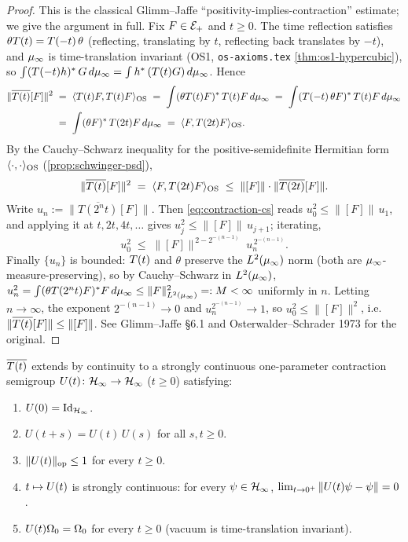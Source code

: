 \begin{proof}
This is the classical Glimm--Jaffe ``positivity-implies-contraction''
estimate; we give the argument in full.  Fix $F \in \mathcal{E}_+$ and $t \ge
0$.  The time reflection satisfies $\theta T(t) = T(-t)\,\theta$ (reflecting,
translating by $t$, reflecting back translates by $-t$), and $\mu_\infty$
is time-translation invariant (OS1, \texttt{os-axioms.tex}
\cref{thm:os1-hypercubic}), so $\int (T(-t) h)^*\, G \, d\mu_\infty =
\int h^*\, (T(t) G)\, d\mu_\infty$.  Hence
\begin{align}
  \|\overline{T(t)}[F]\|^2
  &\;=\; \langle T(t) F, T(t) F \rangle_{\mathrm{OS}}
   \;=\; \int (\theta T(t) F)^*\, T(t) F \, d\mu_\infty
   \;=\; \int (T(-t)\,\theta F)^*\, T(t) F \, d\mu_\infty
  \notag \\
  &\;=\; \int (\theta F)^*\, T(2t) F \, d\mu_\infty
   \;=\; \langle F, T(2t) F \rangle_{\mathrm{OS}}.
  \label{eq:contraction-key}
\end{align}
By the Cauchy--Schwarz inequality for the positive-semidefinite
Hermitian form $\langle \cdot, \cdot \rangle_{\mathrm{OS}}$
(\cref{prop:schwinger-psd}),
\begin{equation}
  \label{eq:contraction-cs}
  \|\overline{T(t)}[F]\|^2
  \;=\; \langle F, T(2t)F \rangle_{\mathrm{OS}}
  \;\le\; \|[F]\| \cdot \|\overline{T(2t)}[F]\|.
\end{equation}
Write $u_n := \|\overline{T(2^n t)}[F]\|$.  Then
\eqref{eq:contraction-cs} reads $u_0^2 \le \|[F]\| \, u_1$, and
applying it at $t, 2t, 4t, \dots$ gives $u_j^2 \le \|[F]\|\, u_{j+1}$;
iterating,
\begin{equation*}
  u_0^{2}
  \;\le\; \|[F]\|^{\,2 - 2^{-(n-1)}} \; u_n^{\,2^{-(n-1)}}.
\end{equation*}
Finally $\{u_n\}$ is bounded: $T(t)$ and $\theta$ preserve the
$L^2(\mu_\infty)$ norm (both are $\mu_\infty$-measure-preserving), so by
Cauchy--Schwarz in $L^2(\mu_\infty)$,
$u_n^2 = \int (\theta T(2^n t) F)^* F \, d\mu_\infty \le \|F\|_{L^2(\mu_\infty)}^2
=: M < \infty$ uniformly in $n$.  Letting $n \to \infty$, the exponent
$2^{-(n-1)} \to 0$ and $u_n^{2^{-(n-1)}} \to 1$, so $u_0^2 \le \|[F]\|^2$,
i.e.\ $\|\overline{T(t)}[F]\| \le \|[F]\|$.  See Glimm--Jaffe \S6.1 and
Osterwalder--Schrader 1973 for the original.
\end{proof}

\begin{theorem}
\label{thm:semigroup}
$\overline{T(t)}$ extends by continuity to a strongly continuous
one-parameter contraction semigroup $U(t) \colon \mathcal{H}_\infty \to \mathcal{H}_\infty$
($t \ge 0$) satisfying:
\begin{enumerate}
  \item $U(0) = \mathrm{Id}_{\mathcal{H}_\infty}$.
  \item $U(t + s) = U(t) \, U(s)$ for all $s, t \ge 0$.
  \item $\|U(t)\|_{\mathrm{op}} \le 1$ for every $t \ge 0$.
  \item $t \mapsto U(t)$ is strongly continuous: for every
    $\psi \in \mathcal{H}_\infty$, $\lim_{t \to 0^+} \|U(t) \psi - \psi\| = 0$.
  \item $U(t) \Omega_0 = \Omega_0$ for every $t \ge 0$  (vacuum
    is time-translation invariant).
\end{enumerate}
\end{theorem}

